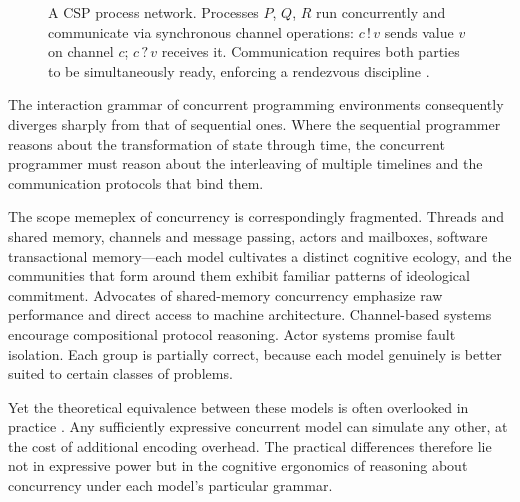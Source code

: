 \documentclass[11pt]{article}
\theoremstyle{definition}
\begin{document}
\begin{figure}[h]
\centering
{}
\caption{A \textsf{CSP} process network. Processes $P$, $Q$, $R$ run
concurrently and communicate via synchronous channel operations:
$c\,!\,v$ sends value $v$ on channel $c$; $c\,?\,v$ receives it.
Communication requires both parties to be simultaneously ready,
enforcing a rendezvous discipline \cite{hoare1985}.}
\label{fig:csp}
\end{figure}

The interaction grammar of concurrent programming environments
consequently diverges sharply from that of sequential ones. Where the
sequential programmer reasons about the transformation of state through
time, the concurrent programmer must reason about the interleaving of
multiple timelines and the communication protocols that bind them.

The scope memeplex of concurrency is correspondingly fragmented. Threads
and shared memory, channels and message passing, actors and mailboxes,
software transactional memory---each model cultivates a distinct
cognitive ecology, and the communities that form around them exhibit
familiar patterns of ideological commitment. Advocates of shared-memory
concurrency emphasize raw performance and direct access to machine
architecture. Channel-based systems encourage compositional protocol
reasoning. Actor systems promise fault isolation. Each group is partially
correct, because each model genuinely is better suited to certain classes
of problems.

Yet the theoretical equivalence between these models is often
overlooked in practice \cite{kleene1952}. Any sufficiently expressive
concurrent model can simulate any other, at the cost of additional
encoding overhead. The practical differences therefore lie not in
expressive power but in the cognitive ergonomics of reasoning about
concurrency under each model's particular grammar.
\end{document}
